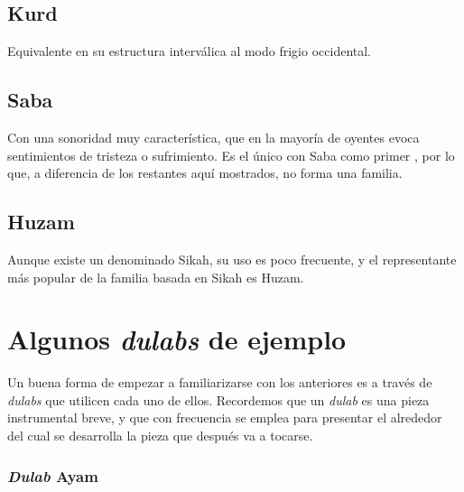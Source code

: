 


\subsection{\Maqam Kurd}

Equivalente en su estructura interválica al modo frigio occidental.




\subsection{\Maqam Saba}

Con una sonoridad muy característica, que en la mayoría de oyentes evoca sentimientos de tristeza o sufrimiento. Es el único \maqam con \yins Saba como primer \yinsb, por lo que, a diferencia de los restantes aquí mostrados, no forma una familia.



\subsection{\Maqam Huzam}

Aunque existe un \maqam denominado Sikah, su uso es poco frecuente, y el representante más popular de la familia basada en \yins Sikah es \maqam Huzam.



\section{Algunos \emph{dulabs} de ejemplo}

Un buena forma de empezar a familiarizarse con los \maqamaat anteriores es a través de \emph{dulabs} que utilicen cada uno de ellos. Recordemos que un \emph{dulab} es una pieza instrumental breve, y que con frecuencia se emplea para presentar el \maqam alrededor del cual se desarrolla la pieza que después va a tocarse.

\subsubsection{\emph{Dulab} Ayam}


\begin{center}
\end{center}


